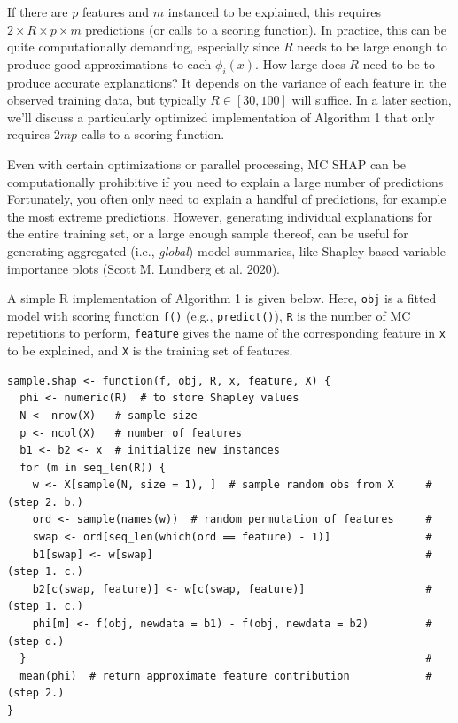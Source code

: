 If there are \(p\) features and \(m\) instanced to be explained, this requires \(2 \times R \times p \times m\) predictions (or calls to a scoring function). In practice, this can be quite computationally demanding, especially since \(R\) needs to be large enough to produce good approximations to each \(\phi_i\left(x\right)\). How large does \(R\) need to be to produce accurate explanations? It depends on the variance of each feature in the observed training data, but typically \(R \in \left[30, 100\right]\) will suffice. In a later section, we'll discuss a particularly optimized implementation of Algorithm 1 that only requires \(2mp\) calls to a scoring function.

Even with certain optimizations or parallel processing, MC SHAP can be computationally prohibitive if you need to explain a large number of predictions Fortunately, you often only need to explain a handful of predictions, for example the most extreme predictions. However, generating individual explanations for the entire training set, or a large enough sample thereof, can be useful for generating aggregated (i.e., \emph{global}) model summaries, like Shapley-based variable importance plots (Scott M. Lundberg et al. 2020).

A simple R implementation of Algorithm 1 is given below. Here, \texttt{obj} is a fitted model with scoring function \texttt{f()} (e.g., \texttt{predict()}), \texttt{R} is the number of MC repetitions to perform, \texttt{feature} gives the name of the corresponding feature in \texttt{x} to be explained, and \texttt{X} is the training set of features.

\begin{verbatim}
sample.shap <- function(f, obj, R, x, feature, X) {
  phi <- numeric(R)  # to store Shapley values
  N <- nrow(X)   # sample size
  p <- ncol(X)   # number of features
  b1 <- b2 <- x  # initialize new instances
  for (m in seq_len(R)) {
    w <- X[sample(N, size = 1), ]  # sample random obs from X     # (step 2. b.)
    ord <- sample(names(w))  # random permutation of features     #
    swap <- ord[seq_len(which(ord == feature) - 1)]               #
    b1[swap] <- w[swap]                                           # (step 1. c.)
    b2[c(swap, feature)] <- w[c(swap, feature)]                   # (step 1. c.)
    phi[m] <- f(obj, newdata = b1) - f(obj, newdata = b2)         # (step d.)
  }                                                               #
  mean(phi)  # return approximate feature contribution            # (step 2.)
}
\end{verbatim}

